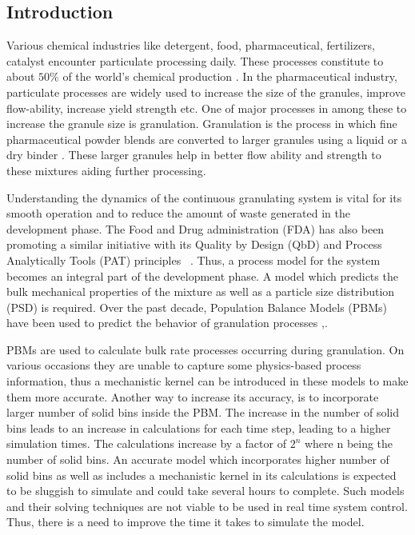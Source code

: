 \documentclass[preprint,10pt,authoryear,review]{elsarticle}
\begin{document}
\begin{linenumbers}
\section{Introduction}
\label{secIntro}
Various chemical industries like detergent, food, pharmaceutical, fertilizers, catalyst encounter 
particulate processing daily. 
These processes constitute to about $50\%$ of the world's chemical production \citep{seville1997}.
In the pharmaceutical industry, particulate processes are widely used to increase 
the size of the granules, improve flow-ability, increase yield strength etc. One of 
major processes in among these to increase the granule size is granulation. 
Granulation is the process in which fine pharmaceutical powder 
blends are converted to larger granules using a liquid or a dry binder \citep{Chaturbedi2017}. 
These larger granules help in better flow ability and strength to these mixtures 
aiding further processing. 


Understanding the dynamics of the continuous granulating system is vital for its smooth 
operation and to reduce the amount of waste generated in the development phase. The Food 
and Drug administration (FDA) has also been promoting a similar initiative with its 
Quality by Design (QbD) and Process Analytically Tools (PAT) principles~\citep{sen2014} 
\citep{FDAPAT2004}. Thus, a process model for the system becomes an integral part 
of the development phase. A model which predicts the bulk mechanical properties of the 
mixture as well as a particle size distribution (PSD) is required. Over the past decade, 
Population Balance Models (PBMs) have been used to predict the behavior of granulation 
processes \citep{Barrasso2013},\citep{Ramachandran2009}. 

PBMs are used to calculate bulk rate processes occurring during granulation. On various occasions 
they are unable to capture some physics-based process information, thus a mechanistic 
kernel can be introduced in these models to make them more accurate. Another way to 
increase its accuracy, is to incorporate larger number of solid bins inside the PBM. 
The increase in the number of solid bins leads to an increase in calculations for each 
time step, leading to a higher simulation times. The calculations increase by a factor 
of $2^n$ where n being the number of solid bins. An accurate model which incorporates higher 
number of solid bins as well as includes a mechanistic kernel in its calculations is expected 
to be sluggish to simulate and could take several hours to complete. Such models and their solving 
techniques are not viable to be used in real time system control. Thus, there is a need to improve 
the time it takes to simulate the model.


\end{linenumbers}
\end{document}
